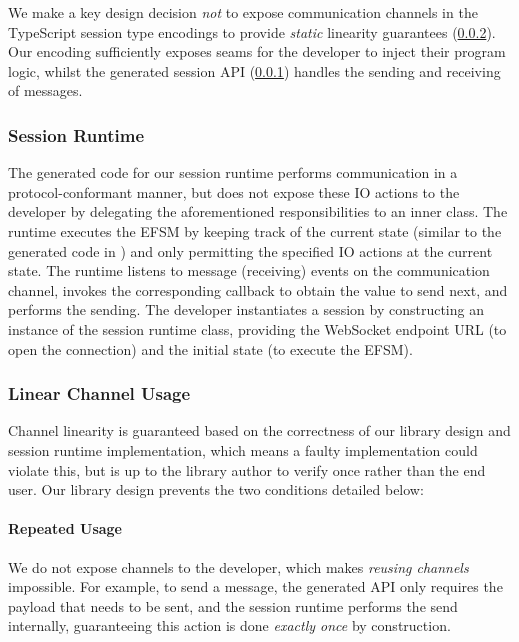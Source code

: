 We make a key design decision \textit{not} to expose communication channels in
the TypeScript session type encodings to provide \textit{static} linearity
guarantees (\cref{section:serverlinear}).
Our encoding sufficiently exposes seams for the developer to inject their
program logic, whilst the generated session API
(\cref{section:serversessionapi}) handles the sending and receiving of
messages.

\subsubsection{Session Runtime}
\label{section:serversessionapi}

The generated code for our session runtime performs communication in a protocol-conformant manner, but
does not expose these IO actions to the developer by delegating the
aforementioned responsibilities to an inner class.
The runtime executes the EFSM by keeping track of
the current state (similar to the generated code in \cite{javatypestate})
and only permitting the specified IO actions at the current state.
The runtime listens to message (receiving) events on the communication channel,
invokes the corresponding callback to obtain the value to send next, and
performs the sending.
The developer instantiates a session by constructing an instance of the
session runtime class, providing the WebSocket endpoint URL (to open the
connection) and the initial state (to execute the EFSM).

\subsubsection{Linear Channel Usage}
\label{section:serverlinear}
Channel linearity is guaranteed based on the correctness of our library design
and session runtime implementation, which means a faulty implementation could
violate this, but is up to the library author to verify once rather than the
end user. Our library design prevents the two conditions detailed below:

\paragraph{Repeated Usage}
We do not expose channels to the developer, which makes \textit{reusing
  channels} impossible.
For example, to send a message, the generated API only requires the payload
that needs to be sent, and the session runtime performs the send internally,
guaranteeing this action is done \textit{exactly once} by construction.


